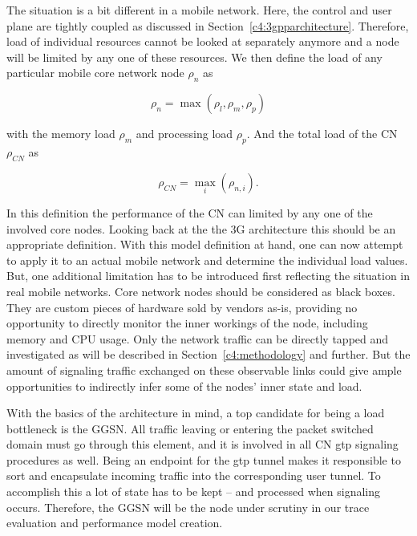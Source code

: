 The situation is a bit different in a mobile network. Here, the control and user plane are tightly coupled as discussed in Section~\ref{c4:3gpparchitecture}.  Therefore, load of individual resources cannot be looked at separately anymore and a node will be limited by any one of these resources. We then define the load of any particular mobile core network node $\rho_{n}$ as

\begin{equation}
\rho_{n} = \max(\rho_{l}, \rho_{m}, \rho_{p})
\end{equation}

with the memory load $\rho_{m}$ and processing load $\rho_{p}$. And the total load of the \gls{CN} $\rho_{CN}$ as

\begin{equation}
\rho_{CN} = \max_{i}(\rho_{n,i})\text{.}
\end{equation}

In this definition the performance of the \gls{CN} can limited by any one of the involved core nodes. Looking back at the the \gls{3G} architecture this should be an appropriate definition. With this model definition at hand, one can now attempt to apply it to an actual mobile network and determine the individual load values. But, one additional limitation has to be introduced first reflecting the situation in real mobile networks. Core network nodes should be considered as black boxes. They are custom pieces of hardware sold by vendors as-is, providing no opportunity to directly monitor the inner workings of the node, including memory and CPU usage. Only the network traffic can be directly tapped and investigated as will be described in Section~\ref{c4:methodology} and further. But the amount of signaling traffic exchanged on these observable links could give ample opportunities to indirectly infer some of the nodes' inner state and load.

With the basics of the architecture in mind, a top candidate for being a load bottleneck is the \gls{GGSN}. All traffic leaving or entering the packet switched domain must go through this element, and it is involved in all \gls{CN} \gls{gtp} signaling procedures as well. Being an endpoint for the \gls{gtp} tunnel makes it responsible to sort and encapsulate incoming traffic into the corresponding user tunnel. To accomplish this a lot of state has to be kept -- and processed when signaling occurs. Therefore, the \gls{GGSN} will be the node under scrutiny in our trace evaluation and performance model creation.

